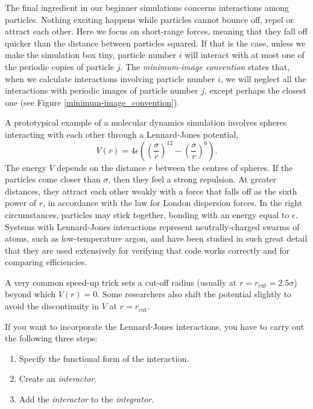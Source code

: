 The final ingredient in our beginner simulations concerns interactions among 
particles. Nothing exciting happens while particles cannot bounce off, repel or 
attract each other. Here we focus on short-range forces, meaning that they fall 
off quicker than the distance between particles squared. If that is the case, 
unless we make the simulation box tiny, particle number $i$ will interact with 
at most one of the periodic copies of particle $j$. The \textit{minimum-image 
convention} states that, when we calculate interactions involving particle 
number $i$, we will neglect all the interactions with periodic images of 
particle number $j$, except perhaps the closest one (see Figure 
\ref{minimum-image_convention}).

A prototypical example of a molecular dynamics simulation involves spheres 
interacting with each other through a Lennard-Jones potential,
\begin{equation*}
  V(r) = 4\epsilon\left(\left(\frac{\sigma}{r}\right)^{12}
                        - \left(\frac{\sigma}{r}\right)^6\right). 
\end{equation*}
The energy $V$ depends on the distance $r$ between the centres of spheres. If 
the particles come closer than $\sigma$, then they feel a strong repulsion. At
greater distances, they attract each other weakly with a force that falls off
as the sixth power of $r$, in accordance with the law for London dispersion
forces. In the right circumstances, particles may stick together, bonding with
an energy equal to $\epsilon$. Systems with Lennard-Jones interactions represent
neutrally-charged swarms of atoms, such as low-temperature argon, and have been
studied in such great detail that they are used extensively for verifying that
code works correctly and for comparing efficiencies.

A very common speed-up trick sets a cut-off radius (usually at
$r = r_{\mathrm{cut}} = 2.5 \sigma$) beyond which $V(r) = 0$. Some researchers
also shift the potential slightly to avoid the discontinuity in $V$ at
$r = r_{\mathrm{cut}}$.

If you want to incorporate the Lennard-Jones interactions, you have to carry out 
the following three steps:
\begin{enumerate}
  \item Specify the functional form of the interaction.
  \item Create an \textit{interactor}.
  \item Add the \textit{interactor} to the \textit{integrator}.
\end{enumerate}

